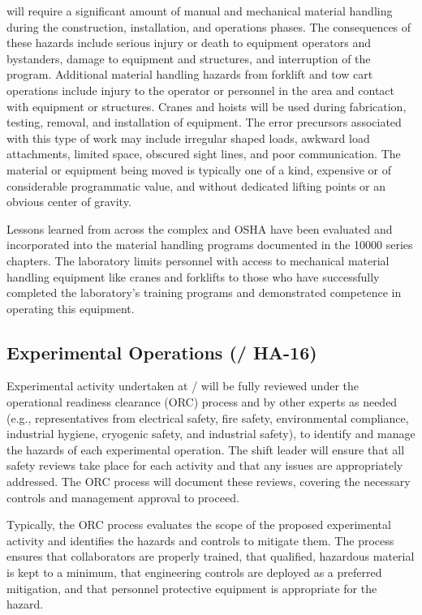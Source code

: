  will require a significant amount of manual and mechanical
material handling during the construction, installation, and operations
phases.  The consequences of these hazards include serious injury or
death to equipment operators and bystanders, damage to equipment and
structures, and interruption of the program.  Additional material
handling hazards from forklift and tow cart operations include injury
to the operator or personnel in the area and contact with equipment or
structures. Cranes and hoists will be used during fabrication,
testing, removal, and installation of equipment. The error precursors
associated with this type of work may include irregular shaped loads,
awkward load attachments, limited space, obscured sight lines, and
poor communication.  The material or equipment being moved is
typically one of a kind, expensive or of considerable programmatic
value, and without dedicated lifting points or an obvious center
of gravity.

Lessons learned from across the  complex and OSHA have been
evaluated and incorporated into the \fnal material handling programs
documented in the  10000 series chapters.  The laboratory
limits personnel with access to mechanical material handling equipment
like cranes and forklifts to those who have successfully completed the
laboratory's training programs and demonstrated competence in
operating this equipment.


\subsection{Experimental Operations (/ HA-16)}

Experimental activity undertaken at / will be
fully reviewed under the operational readiness clearance (ORC) process
and by other experts as needed (e.g., representatives from electrical
safety, fire safety, environmental compliance, industrial hygiene,
cryogenic safety, and industrial safety), to identify and manage the
hazards of each experimental operation. The shift leader will ensure
that all safety reviews take place for each activity and that any
issues are appropriately addressed. The ORC process will document
these reviews, covering the necessary controls and management approval
to proceed.

Typically, the ORC process evaluates the scope of the proposed
experimental activity and identifies the hazards and controls to
mitigate them. The process ensures that collaborators are properly
trained, that qualified, hazardous material is kept to a minimum, that
engineering controls are deployed as a preferred mitigation, and that
personnel protective equipment is appropriate for the hazard.

